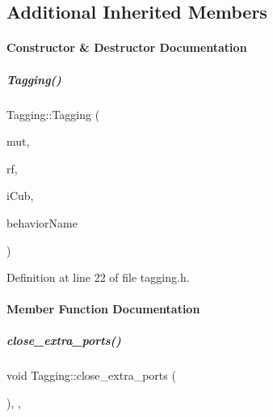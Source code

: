 \subsection*{Additional Inherited Members}


\paragraph{Constructor \& Destructor Documentation}
\mbox{\label{group__behaviorManager_a2441c0398c83ebf013147225930acf1e}} 
\subparagraph{\texorpdfstring{Tagging()}{Tagging()}}
{\footnotesize\ttfamily Tagging\+::\+Tagging (\begin{DoxyParamCaption}\item[{yarp\+::os\+::\+Mutex $\ast$}]{mut,  }\item[{yarp\+::os\+::\+Resource\+Finder \&}]{rf,  }\item[{\hyperlink{group__icubclient__clients_classicubclient_1_1ICubClient}{icubclient\+::\+I\+Cub\+Client} $\ast$}]{i\+Cub,  }\item[{std\+::string}]{behavior\+Name }\end{DoxyParamCaption})\hspace{0.3cm}{\ttfamily [inline]}}



Definition at line 22 of file tagging.\+h.



\paragraph{Member Function Documentation}
\mbox{\label{group__behaviorManager_a2a90e7eda70017f01de96080c05b316c}} 
\subparagraph{\texorpdfstring{close\+\_\+extra\+\_\+ports()}{close\_extra\_ports()}}
{\footnotesize\ttfamily void Tagging\+::close\+\_\+extra\+\_\+ports (\begin{DoxyParamCaption}{ }\end{DoxyParamCaption})\hspace{0.3cm}{\ttfamily [inline]}, {\ttfamily [protected]}, {\ttfamily [virtual]}}



